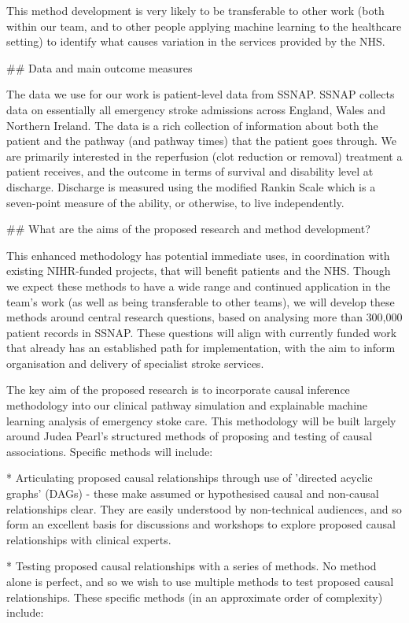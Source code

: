 \begin{markdown}
This method development is very likely to be transferable to other work (both within our team, and to other people applying machine learning to the healthcare setting) to identify what causes variation in the services provided by the NHS.

## Data and main outcome measures

The data we use for our work is patient-level data from SSNAP. SSNAP collects data on essentially all emergency stroke admissions across England, Wales and Northern Ireland. The data is a rich collection of information about both the patient and the pathway (and pathway times) that the patient goes through. We are primarily interested in the reperfusion (clot reduction or removal) treatment a patient receives, and the outcome in terms of survival and disability level at discharge. Discharge is measured using the modified Rankin Scale which is a seven-point measure of the ability, or otherwise, to live independently.   

## What are the aims of the proposed research and method development?

This enhanced methodology has potential immediate uses, in coordination with existing NIHR-funded projects, that will benefit patients and the NHS. Though we expect these methods to have a wide range and continued application in the team's work (as well as being transferable to other teams), we will develop these methods around central research questions, based on analysing more than 300,000 patient records in SSNAP. These questions will align with currently funded work that already has an established path for implementation, with the aim to inform organisation and delivery of specialist stroke services.

The key aim of the proposed research is to incorporate causal inference methodology into our clinical pathway simulation and explainable machine learning analysis of emergency stoke care. This methodology will be built largely around Judea Pearl's structured methods of proposing and testing of causal associations. Specific methods will include:

* Articulating proposed causal relationships through use of 'directed acyclic graphs' (DAGs) - these make assumed or hypothesised causal and non-causal relationships clear. They are easily understood by non-technical audiences, and so form an excellent basis for discussions and workshops to explore proposed causal relationships with clinical experts.

* Testing proposed causal relationships with a series of methods. No method alone is perfect, and so we wish to use multiple methods to test proposed causal relationships. These specific methods (in an approximate order of complexity) include:


\end{markdown}
